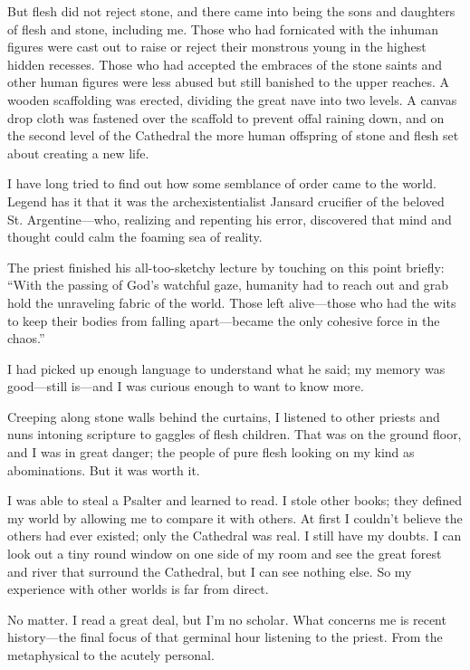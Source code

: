 But flesh did not reject stone, and there came into being the sons and daughters of flesh and stone, including me. Those who had fornicated with the inhuman figures were cast out to raise or reject their monstrous young in the highest hidden recesses. Those who had accepted the embraces of the stone saints and other human figures were less abused but still banished to the upper reaches. A wooden scaffolding was erected, dividing the great nave into two levels. A canvas drop cloth was fastened over the scaffold to prevent offal raining down, and on the second level of the Cathedral the more human offspring of stone and flesh set about creating a new life.

I have long tried to find out how some semblance of order came to the world. Legend has it that it was the archexistentialist Jansard crucifier of the beloved St. Argentine—who, realizing and repenting his error, discovered that mind and thought could calm the foaming sea of reality.

The priest finished his all-too-sketchy lecture by touching on this point briefly: “With the passing of God’s watchful gaze, humanity had to reach out and grab hold the unraveling fabric of the world. Those left alive—those who had the wits to keep their bodies from falling apart—became the only cohesive force in the chaos.”

I had picked up enough language to understand what he said; my memory was good—still is—and I was curious enough to want to know more.

Creeping along stone walls behind the curtains, I listened to other priests and nuns intoning scripture to gaggles of flesh children. That was on the ground floor, and I was in great danger; the people of pure flesh looking on my kind as abominations. But it was worth it.

I was able to steal a Psalter and learned to read. I stole other books; they defined my world by allowing me to compare it with others. At first I couldn’t believe the others had ever existed; only the Cathedral was real. I still have my doubts. I can look out a tiny round window on one side of my room and see the great forest and river that surround the Cathedral, but I can see nothing else. So my experience with other worlds is far from direct.

No matter. I read a great deal, but I’m no scholar. What concerns me is recent history—the final focus of that germinal hour listening to the priest. From the metaphysical to the acutely personal.

